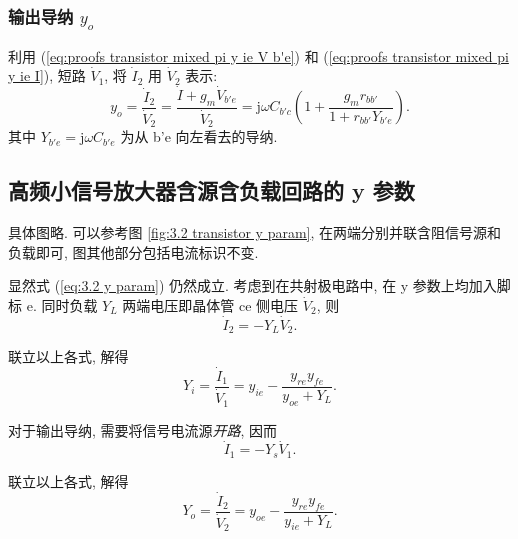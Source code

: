 \subsubsection{输出导纳 \texorpdfstring{$y_o$}{y o}}
利用 (\ref{eq:proofs transistor mixed pi y ie V b'e}) 和 (\ref{eq:proofs transistor mixed pi y ie I}), 短路 $\dot{V}_1$, 将 $\dot{I}_2$ 用 $\dot{V}_2$ 表示:
\begin{equation}
    y_o=\frac{\dot{I}_2}{\dot{V}_2}=\frac{\dot{I}+g_m\dot{V}_{b'e}}{\dot{V}_2}=\mathrm{j}\omega C_{b'c}\left(1+\frac{g_mr_{bb'}}{1+r_{bb'}Y_{b'e}}\right).
\end{equation}
其中 $Y_{b'e}=\mathrm{j}\omega C_{b'e}$ 为从 b'e 向左看去的导纳.

\subsection{高频小信号放大器含源含负载回路的 y 参数} \label{proofs:高频小信号放大器含源含负载回路的 y 参数}
具体图略. 可以参考图 \ref{fig:3.2 transistor y param}, 在两端分别并联含阻信号源和负载即可, 图其他部分包括电流标识不变.

显然式 (\ref{eq:3.2 y param}) 仍然成立. 考虑到在共射极电路中, 在 y 参数上均加入脚标 e. 同时负载 $Y_L$ 两端电压即晶体管 ce 侧电压 $\dot{V}_2$, 则
\begin{equation}
    \dot{I}_2=-Y_L\dot{V}_2.
\end{equation}

联立以上各式, 解得
\begin{equation}
    Y_i=\frac{\dot{I}_1}{\dot{V}_1}=y_{ie}-\frac{y_{re}y_{fe}}{y_{oe}+Y_L}.
\end{equation}

对于输出导纳, 需要将信号电流源\textit{开路}, 因而
\begin{equation}
    \dot{I}_1=-Y_s\dot{V}_1.
\end{equation}

联立以上各式, 解得
\begin{equation}
    Y_o=\frac{\dot{I}_2}{\dot{V}_2}=y_{oe}-\frac{y_{re}y_{fe}}{y_{ie}+Y_L}.
\end{equation}

